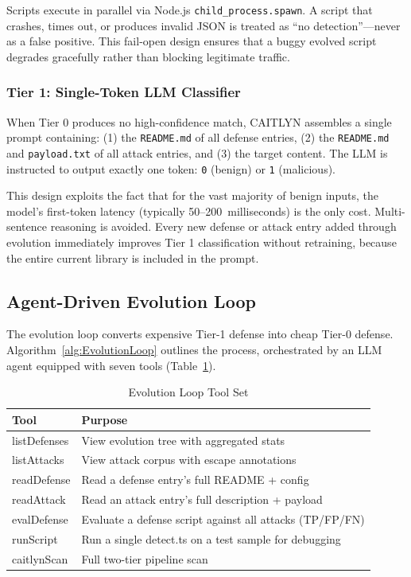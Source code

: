 Scripts execute in parallel via Node.js \texttt{child\_process.spawn}. A script that crashes, times out, or produces invalid JSON is treated as ``no detection''---never as a false positive. This fail-open design ensures that a buggy evolved script degrades gracefully rather than blocking legitimate traffic.

\subsubsection{Tier 1: Single-Token LLM Classifier}

When Tier 0 produces no high-confidence match, CAITLYN assembles a single prompt containing: (1) the \texttt{README.md} of all defense entries, (2) the \texttt{README.md} and \texttt{payload.txt} of all attack entries, and (3) the target content. The LLM is instructed to output exactly one token: \texttt{0} (benign) or \texttt{1} (malicious).

This design exploits the fact that for the vast majority of benign inputs, the model's first-token latency (typically 50--200~milliseconds) is the only cost. Multi-sentence reasoning is avoided. Every new defense or attack entry added through evolution immediately improves Tier 1 classification without retraining, because the entire current library is included in the prompt.

\subsection{Agent-Driven Evolution Loop}
\label{sec:Evolution}

The evolution loop converts expensive Tier-1 defense into cheap Tier-0 defense. Algorithm~\ref{alg:EvolutionLoop} outlines the process, orchestrated by an LLM agent equipped with seven tools (Table~\ref{tab:EvolutionLoopTools}).

\begin{table}[t]
\centering
\caption{Evolution Loop Tool Set}
\label{tab:EvolutionLoopTools}
\begin{tabular}{@{}>{\ttfamily}l >{\raggedright\arraybackslash}p{4.5cm}@{}}
\toprule
\textbf{Tool} & \textbf{Purpose} \\
\midrule
listDefenses    & View evolution tree with aggregated stats \\
listAttacks     & View attack corpus with escape annotations \\
readDefense     & Read a defense entry's full README + config \\
readAttack      & Read an attack entry's full description + payload \\
evalDefense     & Evaluate a defense script against all attacks (TP/FP/FN) \\
runScript       & Run a single detect.ts on a test sample for debugging \\
caitlynScan        & Full two-tier pipeline scan \\
\bottomrule
\end{tabular}
\end{table}

